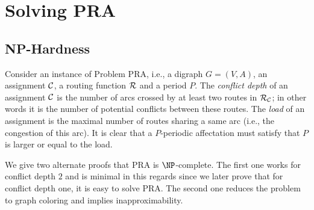 \documentclass[a4paper,10pt]{article}
\begin{document}
	

  
\section{Solving PRA}
  \label{sec:complexity}
  \subsection{NP-Hardness}

Consider an instance of Problem PRA, i.e., a digraph $G=(V,A)$, an assignment $\cal C$, a routing function $\cal R$ and a period $P$. 
The \emph{conflict depth} of an assignment $\cal C$ is the  number of arcs crossed by at least two routes in ${\cal R}_{\cal C}$; in other words it is the number of potential conflicts between these routes. 
The \emph{load} of  an assignment is the maximal number of routes sharing a same arc (i.e., the congestion of this arc).
It is clear that a $P$-periodic affectation must satisfy that $P$ is larger or equal to the load.

We give two alternate proofs that PRA is $\NP$-complete.
The first one works for conflict depth $2$ and is minimal in this regards since we later prove that for conflict depth one,
it is easy to solve PRA. The second one reduces the problem to graph coloring and implies inapproximability. \\
 

 
\end{document}
